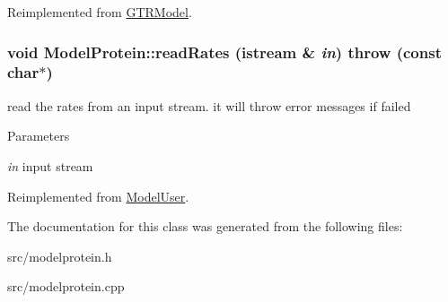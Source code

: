 Reimplemented from \hyperlink{classGTRModel_ad0625a75ce5e8f5fca7f65657b2677b8}{GTRModel}.\hypertarget{classModelProtein_a4809c8c2aaa4e5d976214034b3b94df3}{
\subsubsection[{readRates}]{\setlength{\rightskip}{0pt plus 5cm}void ModelProtein::readRates (istream \& {\em in})  throw (const char$\ast$)}}
\label{classModelProtein_a4809c8c2aaa4e5d976214034b3b94df3}
read the rates from an input stream. it will throw error messages if failed 
\begin{DoxyParams}{Parameters}
\item[{\em in}]input stream \end{DoxyParams}


Reimplemented from \hyperlink{classModelUser_ae0aedeb30d43fbcffcaf5da4bbef5c06}{ModelUser}.

The documentation for this class was generated from the following files:\begin{DoxyCompactItemize}
\item 
src/modelprotein.h\item 
src/modelprotein.cpp\end{DoxyCompactItemize}
